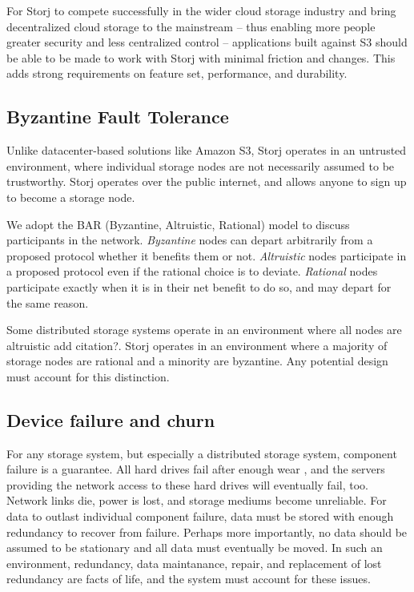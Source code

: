 \documentclass[a4paper,10pt]{article}
\begin{document}
For Storj to compete successfully in the wider cloud storage industry and bring
decentralized cloud storage to the mainstream -- thus enabling more people
greater security and less centralized control -- applications built against S3
should be able to be made to work with Storj with minimal friction and changes.
This adds strong requirements on feature set, performance, and durability.

\subsection{Byzantine Fault Tolerance}

Unlike datacenter-based solutions like Amazon S3, Storj operates in an
untrusted environment, where individual storage nodes are not necessarily assumed
to be trustworthy. Storj operates over the public internet, and allows
anyone to sign up to become a storage node.

We adopt the BAR (Byzantine, Altruistic, Rational) model \cite{bar} to discuss
participants in the network.
  {\em Byzantine} nodes can depart arbitrarily from a proposed protocol whether it benefits them or not.
  {\em Altruistic} nodes participate in a proposed protocol even if the rational choice is to deviate.
  {\em Rational} nodes participate exactly when it is in their net benefit to do so, and may depart for the same 
reason.

Some distributed storage systems operate in an environment where all nodes are
altruistic {\color{red}add citation?}. Storj operates in an environment where a majority of storage
nodes are rational and a minority are byzantine. Any potential
design must account for this distinction.

\subsection{Device failure and churn}

For any storage system, but especially a distributed storage system, component
failure is a guarantee. All hard drives fail
after enough wear \cite{backblaze-hd-2018-q1}, and the servers providing
the network access to these hard drives will eventually fail, too. Network
links die, power is lost, and storage mediums become unreliable. For data
to outlast individual component failure, data must be stored with enough
redundancy to recover from failure. Perhaps more importantly, no data should be
assumed to be stationary and all data must eventually be moved. In such an environment, redundancy, data 
maintanance, repair, and replacement of lost redundancy are facts of life, and the system must account for 
these issues.
\end{document}
